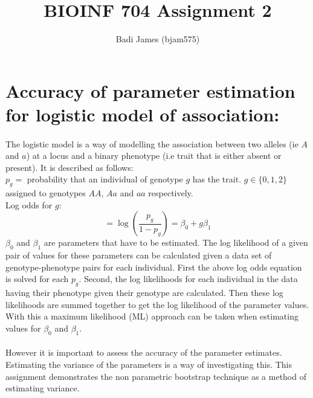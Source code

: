 \documentclass{article}
\title{\vspace{-2.0cm}BIOINF 704 Assignment 2}
\author{Badi James (bjam575)}
\begin{document}
	
	\maketitle
	
	\section{Accuracy of parameter estimation for logistic model of association:}
	
	\paragraph{}The logistic model is a way of modelling the association between two alleles (ie $A$ and $a$) at a locus and a binary phenotype (i.e trait that is either absent or present). It is described as follows: \\
	$p_g =$ probability that an individual of genotype $g$ has the trait. $g \in \{0,1,2\}$ assigned to genotypes $AA$, $Aa$ and $aa$ respectively. \\
	Log odds for $g$: \[= \log(\frac{p_g}{1 - p_g}) = \beta_0 + g \beta_1\]
	$\beta_0$ and $\beta_1$ are parameters that have to be estimated. The log likelihood of a given pair of values for these parameters can be calculated given a data set of genotype-phenotype pairs for each individual. First the above log odds equation is solved for each $p_g$. Second, the log likelihoods for each individual in the data having their phenotype given their genotype are calculated. Then these log likelihoods are summed together to get the log likelihood of the parameter values. With this a maximum likelihood (ML) approach can be taken when estimating values for $\beta_0$ and $\beta_1$.
	
	\paragraph{} However it is important to assess the accuracy of the parameter estimates. Estimating the variance of the parameters is a way of investigating this. This assignment demonstrates the non parametric bootstrap technique as a method of estimating variance.
	
\end{document}

